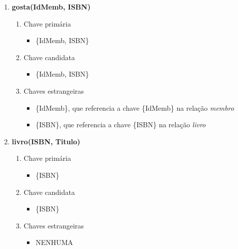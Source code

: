 \documentclass {report}
\begin{document}
\begin{enumerate}[label=-]
    \item \textbf{gosta(IdMemb, ISBN)}
    \begin{enumerate}[label=\arabic*.]
        \item Chave primária
            \begin{itemize}
                \item \{IdMemb, ISBN\}
            \end{itemize}
        \item Chave candidata
            \begin{itemize}
                \item \{IdMemb, ISBN\}
            \end{itemize}
        \item Chaves estrangeiras
            \begin{itemize}
                \item \{IdMemb\}, que referencia a chave \{IdMemb\} na relação \textit{membro}
                \item \{ISBN\}, que referencia a chave \{ISBN\} na relação \textit{livro}
            \end{itemize}
    \end{enumerate}
    
    \item \textbf{livro(ISBN, Titulo)}
    \begin{enumerate}[label=\arabic*.]
        \item Chave primária
            \begin{itemize}
                \item \{ISBN\}
            \end{itemize}
        \item Chave candidata
            \begin{itemize}
                \item \{ISBN\}
            \end{itemize}
        \item Chaves estrangeiras
            \begin{itemize}
                \item NENHUMA
            \end{itemize}
    \end{enumerate}
    

\end{enumerate}
\end{document}
